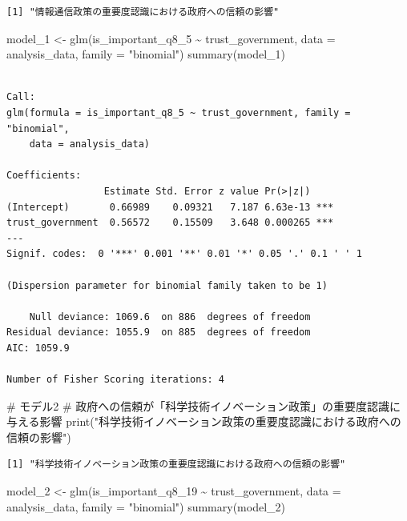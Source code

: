 \documentclass[
  xelatex]{bxjsarticle}
\newenvironment{Shaded}{\begin{snugshade}}{\end{snugshade}}
\newcommand{\AttributeTok}[1]{\textcolor[rgb]{0.40,0.45,0.13}{#1}}
\newcommand{\CommentTok}[1]{\textcolor[rgb]{0.37,0.37,0.37}{#1}}
\newcommand{\FunctionTok}[1]{\textcolor[rgb]{0.28,0.35,0.67}{#1}}
\newcommand{\NormalTok}[1]{\textcolor[rgb]{0.00,0.23,0.31}{#1}}
\newcommand{\OtherTok}[1]{\textcolor[rgb]{0.00,0.23,0.31}{#1}}
\newcommand{\SpecialCharTok}[1]{\textcolor[rgb]{0.37,0.37,0.37}{#1}}
\newcommand{\StringTok}[1]{\textcolor[rgb]{0.13,0.47,0.30}{#1}}
\begin{document}
\begin{verbatim}
[1] "情報通信政策の重要度認識における政府への信頼の影響"
\end{verbatim}

\begin{Shaded}
\begin{Highlighting}[]
\NormalTok{model\_1 }\OtherTok{\textless{}{-}} \FunctionTok{glm}\NormalTok{(is\_important\_q8\_5 }\SpecialCharTok{\textasciitilde{}}\NormalTok{ trust\_government, }\AttributeTok{data =}\NormalTok{ analysis\_data, }\AttributeTok{family =} \StringTok{"binomial"}\NormalTok{)}
\FunctionTok{summary}\NormalTok{(model\_1)}
\end{Highlighting}
\end{Shaded}

\begin{verbatim}

Call:
glm(formula = is_important_q8_5 ~ trust_government, family = "binomial", 
    data = analysis_data)

Coefficients:
                 Estimate Std. Error z value Pr(>|z|)    
(Intercept)       0.66989    0.09321   7.187 6.63e-13 ***
trust_government  0.56572    0.15509   3.648 0.000265 ***
---
Signif. codes:  0 '***' 0.001 '**' 0.01 '*' 0.05 '.' 0.1 ' ' 1

(Dispersion parameter for binomial family taken to be 1)

    Null deviance: 1069.6  on 886  degrees of freedom
Residual deviance: 1055.9  on 885  degrees of freedom
AIC: 1059.9

Number of Fisher Scoring iterations: 4
\end{verbatim}

\begin{Shaded}
\begin{Highlighting}[]
\CommentTok{\# モデル2}
\CommentTok{\# 政府への信頼が「科学技術イノベーション政策」の重要度認識に与える影響}
\FunctionTok{print}\NormalTok{(}\StringTok{"科学技術イノベーション政策の重要度認識における政府への信頼の影響"}\NormalTok{)}
\end{Highlighting}
\end{Shaded}

\begin{verbatim}
[1] "科学技術イノベーション政策の重要度認識における政府への信頼の影響"
\end{verbatim}

\begin{Shaded}
\begin{Highlighting}[]
\NormalTok{model\_2 }\OtherTok{\textless{}{-}} \FunctionTok{glm}\NormalTok{(is\_important\_q8\_19 }\SpecialCharTok{\textasciitilde{}}\NormalTok{ trust\_government, }\AttributeTok{data =}\NormalTok{ analysis\_data, }\AttributeTok{family =} \StringTok{"binomial"}\NormalTok{)}
\FunctionTok{summary}\NormalTok{(model\_2)}
\end{Highlighting}
\end{Shaded}
\end{document}
